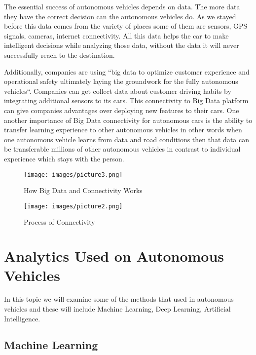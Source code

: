 \documentclass[sigconf]{acmart}
\begin{document}
\par The essential success of autonomous vehicles depends on data. The more data they have the correct decision can the autonomous vehicles do. As we stayed before this data comes from the variety of places some of them are sensors, GPS signals, cameras, internet connectivity. All this data helps the car to make intelligent decisions while analyzing those data, without the data it will never successfully reach to the destination.\cite{www-kdnuggets}

\par Additionally, companies are using ``big data to optimize customer experience and operational safety ultimately laying the groundwork for the fully autonomous vehicles``.\cite{www-webo} Companies can get collect data about customer driving habits by integrating additional sensors to its cars.\cite{www-hb.org} This connectivity to Big Data platform can give companies advantages over deploying new features to their cars. One another importance of Big Data connectivity for autonomous cars is the ability to transfer learning experience to other autonomous vehicles in other words when one autonomous vehicle learns from data and road conditions then that data can be transferable millions of other autonomous vehicles in contrast to individual experience which stays with the person. \cite{www-hb.org}

\begin{figure}[!ht]
  \centering
      \texttt{[image: images/picture3.png]}
  \caption{How Big Data and Connectivity Works}\label{F:connectivity}
\end{figure}

\begin{figure}[!ht]
  \centering
      \texttt{[image: images/picture2.png]}
  \caption{Process of Connectivity}\label{fig:hbsconnectivitysteps}
\end{figure}


\section{Analytics Used on Autonomous Vehicles}
In this topic we will examine some of the methods that used in autonomous vehicles and these will include Machine Learning, Deep Learning, Artificial Intelligence.


\subsection{Machine Learning}
\end{document}
